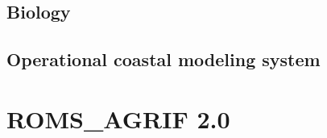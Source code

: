 \documentclass[11pt]{book}
\begin{document}
\section{Biology}


\newpage
\section{Operational coastal modeling system}



\chapter{ROMS\_AGRIF 2.0}

\newpage

\newpage


\newpage

\newpage

\newpage


\newpage
\begin{thebibliography}{}

\end{thebibliography}
\end{document}
